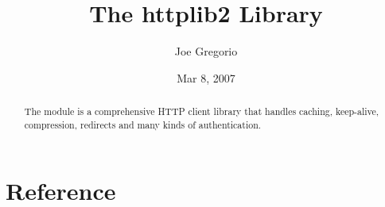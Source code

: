 \documentclass{manual}
\title{The httplib2 Library}
\author{Joe Gregorio}
\date{Mar 8, 2007}       %
\begin{document}
\maketitle


%

\begin{abstract}
\noindent

The  module is a comprehensive HTTP client library
that handles caching, keep-alive, compression, redirects and
many kinds of authentication.


\end{abstract}

\tableofcontents

\chapter{Reference}













%
%
%
\renewcommand{\indexname}{Module Index}

\renewcommand{\indexname}{Index}
\end{document}
